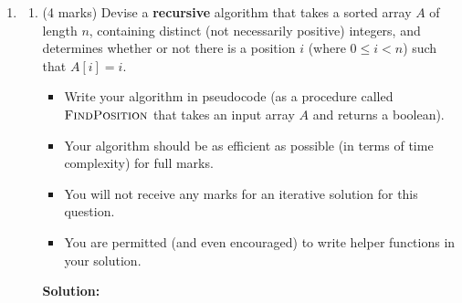 \documentclass[a4,13pt]{extarticle}
\newenvironment{Solution}{\color{blue}\textbf{Solution:}}{}
\begin{document}
\begin{enumerate}
\begin{enumerate}
\begin{Solution}
				Since, it has been proven that if an algorithm runs in $\Theta(g(n))$ it must run in $O(g(n))$ and $\Omega(g(n))$ and it has also been proven that if an algorithm runs in $O(g(n))$ and $\Omega(g(n))$ it must run in $\Theta(g(n))$ the implication has been proven. That is, it has been proven that an algorithm is $\Theta(g(n))$ if and only if it is $O(g(n))$ and also $\Omega(g(n))$.
	      	\end{Solution}
	      	      	      	                  
	      \end{enumerate}
	      	          
	      \newpage 
	      	
	\item 
	      \begin{enumerate}
	      	\item (4 marks) Devise a \textbf{recursive} algorithm that takes a sorted array $A$ of length $n$, containing distinct (not necessarily positive) integers, and determines whether or not there is a position $i$ (where $0\leq i < n$) such that $A[i] = i$.
	      	      \begin{itemize}
	      	      	\item Write your algorithm in pseudocode (as a procedure called $\textsc{FindPosition}$ that takes an input array $A$ and returns a boolean).
	      	      	\item Your algorithm should be as efficient as possible (in terms of time complexity) for full marks.
	      	      	\item You will not receive any marks for an iterative solution for this question. 
	      	      	\item You are permitted (and even encouraged) to write helper functions in your solution.
	      	      \end{itemize}
	      	      
			\begin{Solution}


\end{Solution}
\end{enumerate}
\end{enumerate}
\end{document}
